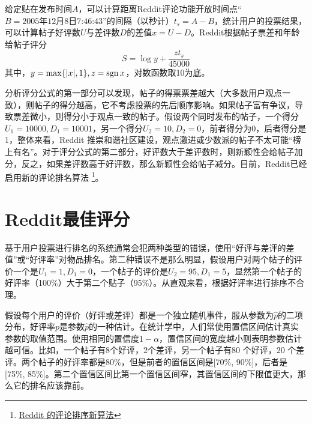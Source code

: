 给定贴在发布时间$A$，可以计算距离Reddit评论功能开放时间点“$B=\text{2005年12月8日7:46:43}$”的间隔（以秒计）$t_s = A - B$，统计用户的投票结果，可以计算帖子好评数$U$与差评数$D$的差值$x=U-D$。Reddit根据帖子票差和年龄给帖子评分
\begin{equation}
    S = \log y + \frac{z t_s}{45000}
\end{equation}
其中，$y=\max\{|x|,1\},z=\operatorname{\mathrm{sgn}} x$，对数函数取10为底。

分析评分公式的第一部分可以发现，帖子的得票票差越大（大多数用户观点一致），则帖子的得分越高，它不考虑投票的先后顺序影响。如果帖子富有争议，导致票差微小，则得分小于观点一致的帖子。假设两个同时发布的帖子，一个得分$U_1=10000,D_1=10001$，另一个得分$U_2=10,D_2=0$，前者得分为0，后者得分是1，整体来看，Reddit 推崇和谐社区建设，观点激进或少数派的帖子不太可能“榜上有名”。对于评分公式的第二部分，好评数大于差评数时，则新颖性会给帖子加分，反之，如果差评数高于好评数，那么新颖性会给帖子减分。目前，Reddit已经启用新的评论排名算法
\footnote{\href{http://jandan.net/2014/04/03/reddits-comment-sorting.html}{Reddit 的评论排序新算法}}。

\section{Reddit最佳评分}%
基于用户投票进行排名的系统通常会犯两种类型的错误，使用“好评与差评的差值”或“好评率”对物品排名。第二种错误不是那么明显，假设用户对两个帖子的评价一个是$U_1=1, D_1=0$，一个帖子的评价是$U_2=95, D_1=5$，显然第一个帖子的好评率（100\%）大于第二个贴子（95\%）。从直观来看，根据好评率进行排序不合理。

假设每个用户的评价（好评或差评）都是一个独立随机事件，服从参数为$\hat{p}$的二项分布，好评率$p$是参数$\hat{p}$的一种估计。在统计学中，人们常使用置信区间估计真实参数的取值范围。使用相同的置信度$1-\alpha$，置信区间的宽度越小则表明参数估计越可信。比如，一个帖子有8个好评，2个差评，另一个帖子有80 个好评，20 个差评。两个帖子的好评率都是80\%，但是前者的置信区间是[70\%, 90\%]，后者是[75\%, 85\%]。第二个置信区间比第一个置信区间窄，其置信区间的下限值更大，那么它的排名应该靠前。

